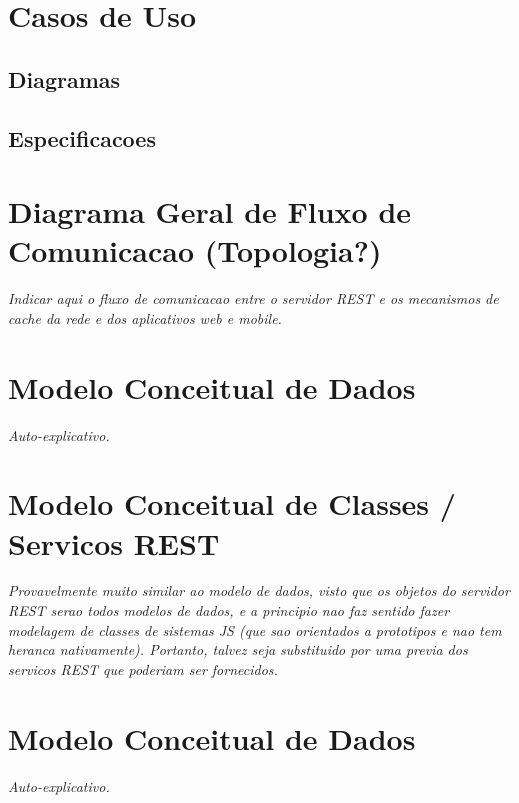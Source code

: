 \documentclass[a4paper,article]{abnt}
\begin{document}
\section{Casos de Uso}

\subsection{Diagramas}

\subsection{Especificacoes}

\section{Diagrama Geral de Fluxo de Comunicacao (Topologia?)}
\emph{Indicar aqui o fluxo de comunicacao entre o servidor REST e os mecanismos de cache da rede e dos aplicativos web e mobile.}

\section{Modelo Conceitual de Dados}
\emph{Auto-explicativo.}

\section{Modelo Conceitual de Classes / Servicos REST}
\emph{Provavelmente muito similar ao modelo de dados, visto que os objetos do servidor REST serao todos modelos de dados, e a principio nao faz sentido fazer modelagem de classes de sistemas JS (que sao orientados a prototipos e nao tem heranca nativamente). Portanto, talvez seja substituido por uma previa dos servicos REST que poderiam ser fornecidos.}

\section{Modelo Conceitual de Dados}
\emph{Auto-explicativo.}
\end{document}
